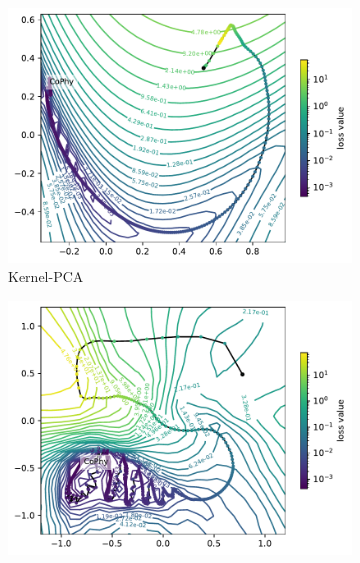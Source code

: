 \documentclass[letterpaper]{article} %
\begin{document}
\begin{figure}[htbp]
\begin{subfigure}[b]{0.3\textwidth}
                \label{fig:PCAvsAE_zoomedPCA}
              \end{subfigure}
              \hfill
              \begin{subfigure}[b]{0.3\textwidth}
                \includegraphics[width=\textwidth]{figures/round3/Kernel-PCA/map_phy_total_loss.pdf}
                \caption{Kernel-PCA}
             \label{fig:KernelPCAloss}
              \end{subfigure}
              \begin{subfigure}[b]{0.3\textwidth}
                \includegraphics[width=\textwidth]{figures/round3/Cophy_NV/map_phy_total_loss.pdf}

\end{subfigure}
\end{figure}
\end{document}
